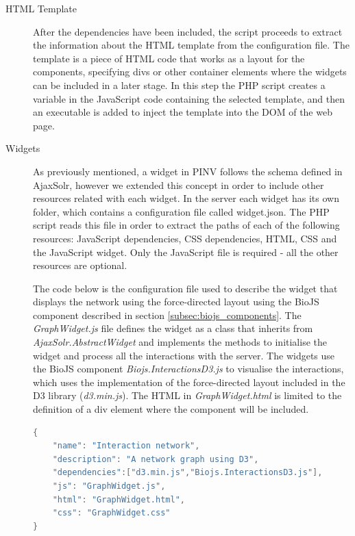 \begin{description}
\item[HTML Template]
After the dependencies have been included, the script proceeds to extract the information about the HTML template from the configuration file. The template is a piece of HTML code that works as a layout for the components, specifying divs or other container elements where the widgets can be included in a later stage. In this step the PHP script creates a variable in the JavaScript code containing the selected template, and then an executable is added to inject the template into the DOM of the web page.

\item[Widgets]
As previously mentioned, a widget in PINV follows the schema defined in AjaxSolr, however we extended this concept in order to include other resources related with each widget. In the server each widget has its own folder, which contains a configuration file called widget.json. The PHP script reads this file in order to extract the paths of each of the following resources: JavaScript dependencies, CSS dependencies, HTML, CSS and the JavaScript widget. Only the JavaScript file is required - all the other resources are optional. 

The code below is the configuration file used to describe the widget that displays the network using the force-directed layout using the BioJS component described in section \ref{subsec:biojs_components}. The \emph{GraphWidget.js} file defines the widget as a class that inherits from \emph{AjaxSolr.AbstractWidget} and implements the methods to initialise the widget and process all the interactions with the server. The widgets use the BioJS component \emph{Biojs.InteractionsD3.js} to visualise the interactions, which uses the implementation of the force-directed layout included in the D3 library (\emph{d3.min.js}). The HTML in \emph{GraphWidget.html} is limited to the definition of a div element where the component will be included.

\begin{lstlisting}[language=java]
{
    "name": "Interaction network",
    "description": "A network graph using D3",
    "dependencies":["d3.min.js","Biojs.InteractionsD3.js"],
    "js": "GraphWidget.js",
    "html": "GraphWidget.html",
    "css": "GraphWidget.css"
} 
\end{lstlisting}


\end{description}
